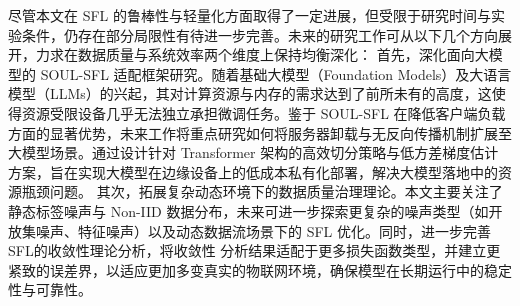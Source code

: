尽管本文在 SFL 的鲁棒性与轻量化方面取得了一定进展，但受限于研究时间与实验条件，仍存在部分局限性有待进一步完善。未来的研究工作可从以下几个方向展开，力求在数据质量与系统效率两个维度上保持均衡深化：
首先，深化面向大模型的 SOUL-SFL 适配框架研究。随着基础大模型（Foundation Models）及大语言模型（LLMs）的兴起，其对计算资源与内存的需求达到了前所未有的高度，这使得资源受限设备几乎无法独立承担微调任务。鉴于 SOUL-SFL 在降低客户端负载方面的显著优势，未来工作将重点研究如何将服务器卸载与无反向传播机制扩展至大模型场景。通过设计针对 Transformer 架构的高效切分策略与低方差梯度估计方案，旨在实现大模型在边缘设备上的低成本私有化部署，解决大模型落地中的资源瓶颈问题。
其次，拓展复杂动态环境下的数据质量治理理论。本文主要关注了静态标签噪声与 Non-IID 数据分布，未来可进一步探索更复杂的噪声类型（如开放集噪声、特征噪声）以及动态数据流场景下的 SFL 优化。同时，进一步完善SFL的收敛性理论分析，将收敛性
分析结果适配于更多损失函数类型，并建立更紧致的误差界，以适应更加多变真实的物联网环境，确保模型在长期运行中的稳定性与可靠性。